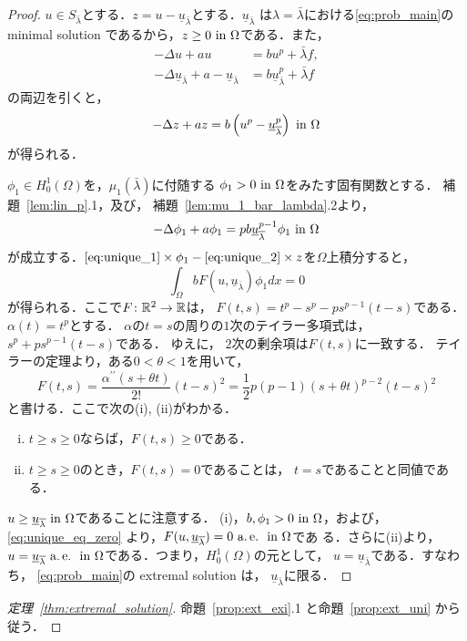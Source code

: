 \begin{proof}
 $u \in S_{\bar{\lambda}}$とする．$z = u -
 \underline{u}_{\bar{\lambda}}$とする．$\underline{u}_{\bar{\lambda}}$
 は$\lambda = \bar{\lambda}$における\ref{eq:prob_main}の
 minimal solution であるから，$z \geq 0 ~\text{in}~ \Omega$である．また，
 \begin{align*}
  -\Delta u + au &= bu^p + \bar{\lambda} f, \\
  -\Delta \underline{u}_{\bar{\lambda}} + a
  -\underline{u}_{\bar{\lambda}}
  &= b \underline{u}_{\bar{\lambda}}^p + \bar{\lambda} f
 \end{align*}
 の両辺を引くと，
 \begin{equation}
  -\Delta z + az = b \left( u^p - \underline{u}_{\overline{\lambda}}^p
 \right) ~\text{in}~ \Omega \label{eq:unique_1}
 \end{equation}
 が得られる．
 
 $\phi_1 \in H_0^1(\Omega)$を，$\mu_1(\bar{\lambda})$に付随する
 $\phi_1 > 0 ~\text{in}~ \Omega$をみたす固有関数とする．
 補題~\ref{lem:lin_p}.1，及び，
 補題~\ref{lem:mu_1_bar_lambda}.2より，
 \begin{equation}
  -\Delta \phi_1 + a\phi_1 = pb \underline{u}_{\overline{\lambda}}^{p-1}
   \phi_1 ~\text{in}~ \Omega \label{eq:unique_2}
 \end{equation}
 が成立する．$\text{\eqref{eq:unique_1}} \times \phi_1 -
 \text{\eqref{eq:unique_2}} \times z$を$\Omega$上積分すると，
 \begin{equation}
  \int_\Omega b F(u, \underline{u}_{\bar{\lambda}}) \phi_1 dx = 0
   \label{eq:unique_eq_zero}
 \end{equation}
 が得られる．ここで$F \colon \mathbb{R}^2 \to \mathbb{R}$は，
 $F(t, s) = t^p - s^p - ps^{p-1}(t-s)$である．
 $\alpha(t) = t^p$とする．
 $\alpha$の$t = s$の周りの$1$次のテイラー多項式は，
 $s^p + ps^{p-1}(t-s)$である．
 ゆえに，
 $2$次の剰余項は$F(t, s)$に一致する．
 テイラーの定理より，ある$0 < \theta < 1$を用いて，
 \[
  F(t, s) = \frac{\alpha^{\prime\prime}(s + \theta t)}{2!} (t-s)^2 = \frac{1}{2}
 p(p-1) (s+ \theta t)^{p-2} (t-s)^2
 \]
 と書ける．ここで次の(i), (ii)がわかる．
 \begin{enumerate}[(i)]
  \item $t \geq s \geq 0$ならば，$F(t, s) \geq 0$である．
  \item $t \geq s \geq 0$のとき，$F(t, s) = 0$であることは，
        $t = s$であることと同値である．
 \end{enumerate}
 $u \geq \underline{u}_{\overline{\lambda}} ~\text{in}~ \Omega$であることに注意する．
 (i)，$b, \phi_1 > 0 ~\text{in}~ \Omega$，および，\eqref{eq:unique_eq_zero}
 より，$F(u, \underline{u}_{\overline{\lambda}}) = 0 ~\text{a.\,e.}~ ~\text{in}~ \Omega$であ
 る．さらに(ii)より，$u = \underline{u}_{\overline{\lambda}} ~\text{a.\,e.}~ ~\text{in}~
 \Omega$である．つまり，$H_0^1(\Omega)$の元として，
 $u = \underline{u}_{\bar{\lambda}}$である．すなわち，
 \ref{eq:prob_main}の extremal solution は，
 $\underline{u}_{\bar{\lambda}}$に限る． \qedhere
\end{proof}

\begin{proof}[定理~\ref{thm:extremal_solution}]
 命題~\ref{prop:ext_exi}.1 と命題~\ref{prop:ext_uni} から従う．\qedhere
\end{proof}

